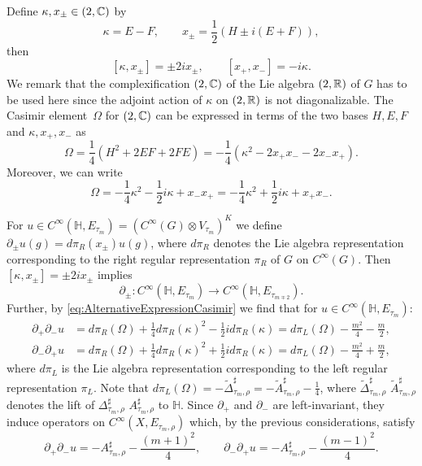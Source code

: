 \documentclass[10pt]{amsart}
\theoremstyle{plain}
\theoremstyle{definition}
\theoremstyle{remark}
\newcommand{\R}{\mathbb{R}}
\renewcommand{\H}{\mathbb{H}}
\newcommand{\C}{\mathbb{C}}
\let\sl\relax
\DeclareMathOperator{\sl}{\mathfrak{sl}}
\numberwithin{equation}{section}
\begin{document}
Define $\kappa,x_\pm\in\sl(2,\C)$ by
\[
\kappa = E-F, \qquad x_\pm = \frac{1}{2}(H\pm i(E+F)),
\]
then
\[
[\kappa,x_\pm] = \pm2ix_\pm, \qquad [x_+,x_-] = -i\kappa.
\]
We remark that the complexification $\sl(2,\C)$ of the Lie algebra $\sl(2,\R)$ of $G$ has to be used here since the adjoint action of $\kappa$ on $\sl(2,\R)$ is not diagonalizable. The Casimir element~$\Omega$ for $\sl(2,\C)$ can be expressed in terms of the two bases $H,E,F$ and $\kappa,x_+,x_-$ as
\[
\Omega = \frac{1}{4}(H^2+2EF+2FE) = -\frac{1}{4}(\kappa^2-2x_+x_--2x_-x_+).
\]
Moreover, we can write
\begin{equation}
\Omega = -\frac{1}{4}\kappa^2-\frac{1}{2}i\kappa+x_-x_+ = -\frac{1}{4}\kappa^2+\frac{1}{2}i\kappa+x_+x_-.\label{eq:AlternativeExpressionCasimir}
\end{equation}

For $u\in C^\infty(\H,E_{\tau_m})=(C^\infty(G)\otimes V_{\tau_m})^K$ we define $\partial_\pm u(g)=d\pi_R(x_\pm)u(g)$, where $d\pi_R$ denotes the Lie algebra representation corresponding to the right regular representation $\pi_R$ of $G$ on $C^\infty(G)$. Then $[\kappa,x_\pm]=\pm 2ix_\pm$ implies
\[
\partial_\pm:C^\infty(\H,E_{\tau_m})\to C^\infty(\H,E_{\tau_{m\mp2}}).
\]
Further, by \cref{eq:AlternativeExpressionCasimir} we find that for $u\in C^\infty(\H,E_{\tau_m})$:
\begin{align*}
\partial_+\partial_-u &= d\pi_R(\Omega)+\frac{1}{4}d\pi_R(\kappa)^2-\frac{1}{2}id\pi_R(\kappa) = d\pi_L(\Omega)-\frac{m^2}{4}-\frac{m}{2},\\
\partial_-\partial_+u &= d\pi_R(\Omega)+\frac{1}{4}d\pi_R(\kappa)^2+\frac{1}{2}id\pi_R(\kappa) = d\pi_L(\Omega)-\frac{m^2}{4}+\frac{m}{2},
\end{align*}
where $d\pi_L$ is the Lie algebra representation corresponding to the left regular representation $\pi_L$. Note that $d\pi_L(\Omega)=-\widetilde{\Delta}_{\tau_m,\rho}^\sharp=-\widetilde{A}_{\tau_m,\rho}^\sharp-\frac{1}{4}$, where $\widetilde{\Delta}_{\tau_m,\rho}^\sharp$ \resp $\widetilde{A}_{\tau_m,\rho}^\sharp$ denotes the lift of $\Delta_{\tau_m,\rho}^\sharp$ \resp $A_{\tau_m,\rho}^\sharp$ to $\H$. Since $\partial_+$ and $\partial_-$ are left-invariant, they induce operators on $C^\infty(X,E_{\tau_m,\rho})$ which, by the previous considerations, satisfy
\begin{equation}
\partial_+\partial_-u = -A_{\tau_m,\rho}^\sharp-\frac{(m+1)^2}{4}, \qquad \partial_-\partial_+u = -A_{\tau_m,\rho}^\sharp-\frac{(m-1)^2}{4}.\label{eq:PartialPlusMinusVsLaplacian}
\end{equation}
\end{document}
